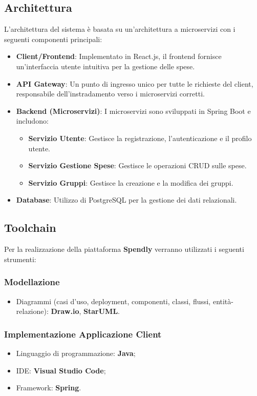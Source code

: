 \subsection{Architettura}
    L'architettura del sistema è basata su un'architettura a microservizi con i seguenti componenti principali:
    \begin{itemize}
        \item \textbf{Client/Frontend}: Implementato in React.js, il frontend fornisce un'interfaccia utente intuitiva per la gestione delle spese.
        \item \textbf{API Gateway}: Un punto di ingresso unico per tutte le richieste del client, responsabile dell'instradamento verso i microservizi corretti.
        \item \textbf{Backend (Microservizi)}: I microservizi sono sviluppati in Spring Boot e includono:
        \begin{itemize}
            \item \textbf{Servizio Utente}: Gestisce la registrazione, l'autenticazione e il profilo utente.
            \item \textbf{Servizio Gestione Spese}: Gestisce le operazioni CRUD sulle spese.
            \item \textbf{Servizio Gruppi}: Gestisce la creazione e la modifica dei gruppi.
        \end{itemize}
        \item \textbf{Database}: Utilizzo di PostgreSQL per la gestione dei dati relazionali.
    \end{itemize}

\subsection{Toolchain}
Per la realizzazione della piattaforma \textbf{Spendly} verranno utilizzati i seguenti strumenti:

\subsubsection*{Modellazione}
\begin{itemize}
    \item Diagrammi (casi d'uso, deployment, componenti, classi, flussi, entità-relazione): \textbf{Draw.io}, \textbf{StarUML}.
\end{itemize}

\subsubsection*{Implementazione Applicazione Client}
\begin{itemize}
    \item Linguaggio di programmazione: \textbf{Java};
    \item IDE: \textbf{Visual Studio Code};
    \item Framework: \textbf{Spring}.
\end{itemize}

